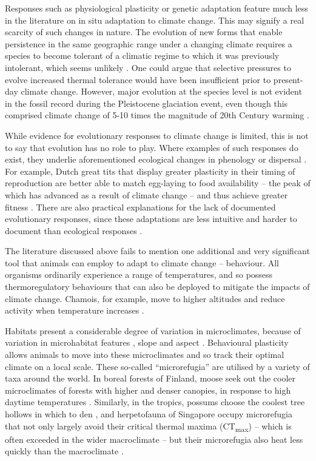 \documentclass[12pt,a4paper,]{report}
\theoremstyle{definition}
\theoremstyle{definition}
\theoremstyle{definition}
\theoremstyle{remark}
\begin{document}
Responses such as physiological plasticity or genetic adaptation feature
much less in the literature on in situ adaptation to climate change.
This may signify a real scarcity of such changes in nature. The
evolution of new forms that enable persistence in the same geographic
range under a changing climate requires a species to become tolerant of
a climatic regime to which it was previously intolerant, which seems
unlikely \citep{parmesan_ecological2006}. One could argue that selective
pressures to evolve increased thermal tolerance would have been
insufficient prior to present-day climate change. However, major
evolution at the species level is not evident in the fossil record
during the Pleistocene glaciation event, even though this comprised
climate change of 5-10 times the magnitude of 20th Century warming
\citep{parmesan_ecological2006}.

While evidence for evolutionary responses to climate change is limited,
this is not to say that evolution has no role to play. Where examples of
such responses do exist, they underlie aforementioned ecological changes
in phenology or dispersal \citep{parmesan_ecological2006}. For example,
Dutch great tits that display greater plasticity in their timing of
reproduction are better able to match egg-laying to food availability --
the peak of which has advanced as a result of climate change -- and thus
achieve greater fitness \citep{nussey_selection2005}. There are also
practical explanations for the lack of documented evolutionary
responses, since these adaptations are less intuitive and harder to
document than ecological responses \citep{oconnor_toward2012}.

The literature discussed above fails to mention one additional and very
significant tool that animals can employ to adapt to climate change --
behaviour. All organisms ordinarily experience a range of temperatures,
and so possess thermoregulatory behaviours that can also be deployed to
mitigate the impacts of climate change. Chamois, for example, move to
higher altitudes and reduce activity when temperature increases
\citep{mason_predicting2014}.

Habitats present a considerable degree of variation in microclimates,
because of variation in microhabitat features
\citep{scheffers_microhabitats2014}, slope and aspect
\citep{suggitt_habitat2011}. Behavioural plasticity allows animals to
move into these microclimates \citep{scheffers_microhabitats2014} and so
track their optimal climate on a local scale. These so-called
``microrefugia'' are utilised by a variety of taxa around the world. In
boreal forests of Finland, moose seek out the cooler microclimates of
forests with higher and denser canopies, in response to high daytime
temperatures \citep{melin_moose2014}. Similarly, in the tropics, possums
choose the coolest tree hollows in which to den
\citep{isaac_microclimate2008}, and herpetofauna of Singapore occupy
microrefugia that not only largely avoid their critical thermal maxima
(CT\textsubscript{max}) -- which is often exceeded in the wider
macroclimate -- but their microrefugia also heat less quickly than the
macroclimate \citep{scheffers_microhabitats2014}.
\end{document}
